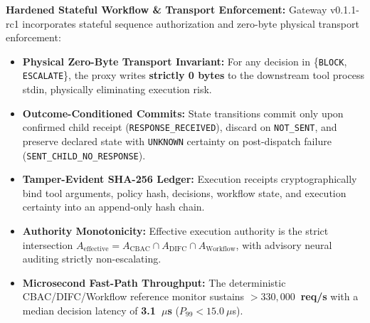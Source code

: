 \documentclass[10pt,journal,compsoc]{IEEEtran}
\begin{document}
\textbf{Hardened Stateful Workflow \& Transport Enforcement:} Gateway v0.1.1-rc1 incorporates stateful sequence authorization and zero-byte physical transport enforcement:
\begin{itemize}
    \item \textbf{Physical Zero-Byte Transport Invariant:} For any decision in \{\texttt{BLOCK}, \texttt{ESCALATE}\}, the proxy writes \textbf{strictly 0 bytes} to the downstream tool process stdin, physically eliminating execution risk.
    \item \textbf{Outcome-Conditioned Commits:} State transitions commit only upon confirmed child receipt (\texttt{RESPONSE\_RECEIVED}), discard on \texttt{NOT\_SENT}, and preserve declared state with \texttt{UNKNOWN} certainty on post-dispatch failure (\texttt{SENT\_CHILD\_NO\_RESPONSE}).
    \item \textbf{Tamper-Evident SHA-256 Ledger:} Execution receipts cryptographically bind tool arguments, policy hash, decisions, workflow state, and execution certainty into an append-only hash chain.
    \item \textbf{Authority Monotonicity:} Effective execution authority is the strict intersection $A_{\text{effective}} = A_{\text{CBAC}} \cap A_{\text{DIFC}} \cap A_{\text{Workflow}}$, with advisory neural auditing strictly non-escalating.
    \item \textbf{Microsecond Fast-Path Throughput:} The deterministic CBAC/DIFC/Workflow reference monitor sustains \textbf{$>330,000$~req/s} with a median decision latency of \textbf{3.1~$\mu$s} ($P_{99} < 15.0~\mu$s).
\end{itemize}
\end{document}
